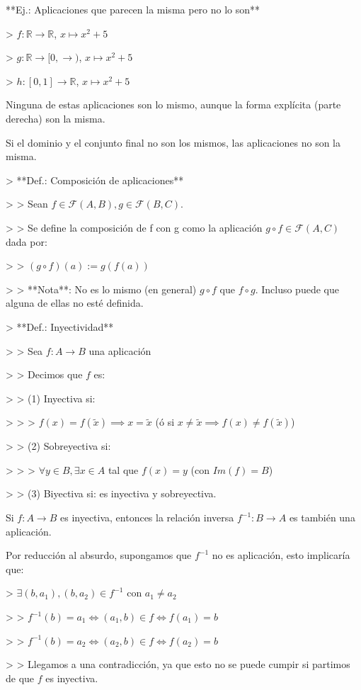 **Ej.: Aplicaciones que parecen la misma pero no lo son**

> $f: \mathbb{R} \to \mathbb{R}$, $x \mapsto x^2 + 5$

> $g: \mathbb{R} \to [0,\rightarrow)$, $x \mapsto x^2 +5$

> $h: [0,1] \to \mathbb{R}$, $x \mapsto x^2 + 5$

Ninguna de estas aplicaciones son lo mismo, aunque la forma explícita (parte derecha) son la misma.

Si el dominio y el conjunto final no son los mismos, las aplicaciones no son la misma.

> **Def.: Composición de aplicaciones**

> > Sean $f \in \mathcal{F}(A,B), g \in \mathcal{F}(B,C)$.

> > Se define la composición de f con g como la aplicación $g \circ f \in \mathcal{F}(A,C)$ dada por:

> > $(g \circ f)(a) := g(f(a))$

> > **Nota**: No es lo mismo (en general) $g \circ f$ que $f \circ g$. Incluso puede que alguna de ellas no esté definida.

> **Def.: Inyectividad**

> > Sea $f: A \to B$ una aplicación

> > Decimos que $f$ es:

> > (1) Inyectiva si:

> > > $f(x) = f(\tilde{x}) \implies x = \tilde{x}$ (ó si $x \neq \tilde{x} \implies f(x) \neq f(\tilde{x})$)

> > (2) Sobreyectiva si:

> > > $\forall y \in B, \exists x \in A$ tal que $f(x) = y$ (con $Im(f) = B$)

> > (3) Biyectiva si: es inyectiva y sobreyectiva.

Si $f: A \to B$ es inyectiva, entonces la relación inversa $f^{-1}: B \to A$ es también una aplicación.

Por reducción al absurdo, supongamos que $f^{-1}$ no es aplicación, esto implicaría que:

> $\exists (b,a_1), (b,a_2) \in f^{-1}$ con $a_1 \neq a_2$

> > $f^{-1}(b) = a_1 \iff (a_1,b) \in f \iff f(a_1) = b$

> > $f^{-1}(b) = a_2 \iff (a_2,b) \in f \iff f(a_2) = b$

> > Llegamos a una contradicción, ya que esto no se puede cumpir si partimos de que $f$ es inyectiva.

